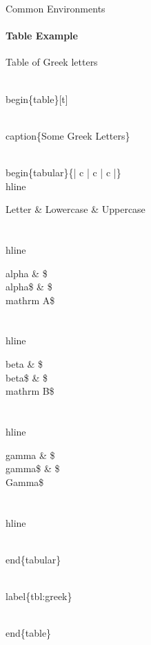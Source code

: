 \documentclass{beamer}
\begin{document}
\begin{frame}{Common Environments}
	\framesubtitle{Table Example}
	\begin{exampleblock}{Table of Greek letters}
		\begin{semiverbatim}
			\\begin\{table\}[t]
			
			\\caption\{Some Greek Letters\}
			
				\\begin\{tabular\}\{| c | c | c |\}\\hline
				
				Letter \& Lowercase \& Uppercase \\\\\ \\hline
				
				alpha \& \$\\alpha\$ \& \$\\mathrm A\$ \\\\\ \\hline
				
				beta \& \$\\beta\$ \& \$\\mathrm B\$ \\\\\ \\hline
				
				gamma \& \$\\gamma\$ \& \$\\Gamma\$ \\\\\ \\hline
				
				\\end\{tabular\}
				
			\\label\{tbl:greek\}

			\\end\{table\}
		\end{semiverbatim}
	\end{exampleblock}
\end{frame}
\end{document}
